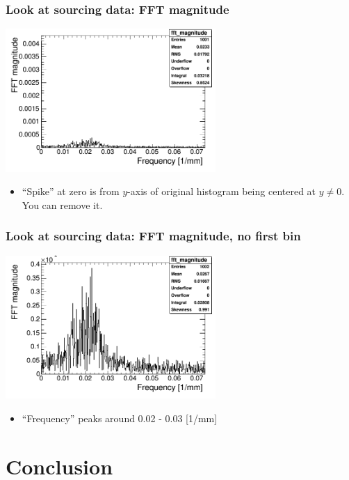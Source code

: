 \documentclass[bigger]{beamer}
\begin{document}
\begin{frame}
\frametitle{Look at sourcing data: FFT magnitude}
\label{sec-3-1-5}
\label{sec-3-1-5-1}

\centering
\includegraphics[width=0.6\textwidth]{fig/FFT_magnitude.png}
\begin{itemize}

\item ``Spike'' at zero is from $y$-axis of original histogram being centered at $y \neq 0$.  You can remove it.
\label{sec-3-1-5-2}%
\end{itemize} %
\end{frame}
\begin{frame}
\frametitle{Look at sourcing data: FFT magnitude, no first bin}
\label{sec-3-1-6}
\label{sec-3-1-6-1}

\centering
\includegraphics[width=0.6\textwidth]{fig/FFT_magnitude_zeroFirstBin.png}
\begin{itemize}

\item ``Frequency'' peaks around 0.02 - 0.03 [1/mm]
\label{sec-3-1-6-2}%
\end{itemize} %
\end{frame}
\section{Conclusion}
\label{sec-4}
\end{document}
